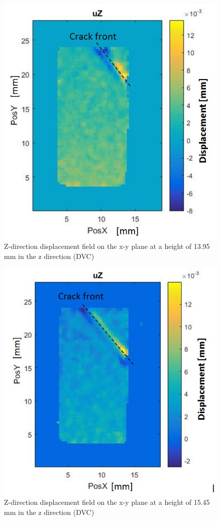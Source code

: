 \begin{figure}[h]
    \centering
    \includegraphics[scale=0.4]{DVC3}
    \caption{Z-direction displacement field on the x-y plane at a height of 13.95 mm in the z direction (DVC)}
    \label{fig:DVC1}
\end{figure}

\begin{figure}[h]
    \centering
    \includegraphics[scale=0.4]{DVC4}
    \caption{Z-direction displacement field on the x-y plane at a height of 15.45 mm in the z direction (DVC)}
    \label{fig:DVC2}
\end{figure}



